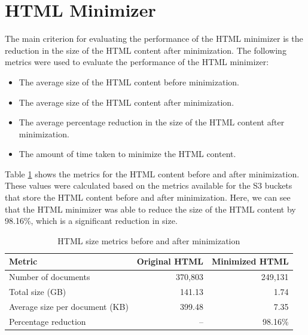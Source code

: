 \section{HTML Minimizer}\label{sec:html_minimizer}

The main criterion for evaluating the performance of the HTML minimizer is the reduction in the size of the HTML content after minimization.
The following metrics were used to evaluate the performance of the HTML minimizer:
\begin{itemize}
    \item The average size of the HTML content before minimization.
    \item The average size of the HTML content after minimization.
    \item The average percentage reduction in the size of the HTML content after minimization.
    \item The amount of time taken to minimize the HTML content.
\end{itemize}

Table \ref{tab:html-minimizer-metrics} shows the metrics for the HTML content before and after minimization.
These values were calculated based on the metrics available for the S3 buckets that store the HTML content before and after minimization.
Here, we can see that the HTML minimizer was able to reduce the size of the HTML content by 98.16\%, which is a significant reduction in size.

\begin{table}[H]
    \centering
    \begin{tabular}{lrr}
        \toprule
        \textbf{Metric} & \textbf{Original HTML} & \textbf{Minimized HTML} \\
        \midrule
        Number of documents & 370,803\footnotemark[1] & 249,131\footnotemark[1] \\
        Total size (GB) & 141.13 & 1.74 \\
        Average size per document (KB) & 399.48 & 7.35 \\
        Percentage reduction & -- & 98.16\% \\
        \bottomrule
    \end{tabular}
    \caption{HTML size metrics before and after minimization}
    \label{tab:html-minimizer-metrics}
\end{table}


